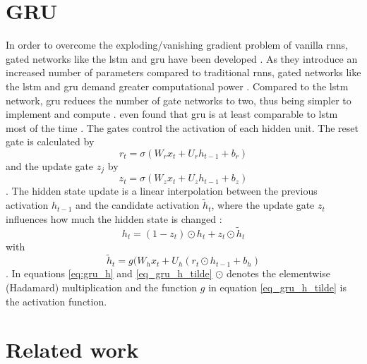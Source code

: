 \documentclass[12pt, a4paper, headinclude, twoside, plainheadsepline, open=right, numbers=noenddot, hidelinks, toc=listof, toc=bibliography]{scrreprt}
\begin{document}
\section{GRU}
\label{sec:gru}
In order to overcome the exploding/vanishing gradient problem of vanilla \acp{rnn}, gated networks like the \ac{lstm} \cite{hochreiterLongShortTermMemory1997} and \ac{gru} \cite{choLearningPhraseRepresentations2014} have been developed \cite{vanhoudtReviewLongShortterm2020}.
As they introduce an increased number of parameters compared to traditional \acp{rnn}, gated networks like the \ac{lstm} and \ac{gru} demand greater computational power \cite{deyGatevariantsGatedRecurrent2017}.
Compared to the \ac{lstm} network, \ac{gru} reduces the number of gate networks to two, thus being simpler to implement and compute \cite{choLearningPhraseRepresentations2014}.
 even found that \ac{gru} is at least comparable to \ac{lstm} most of the time \cite{chungEmpiricalEvaluationGated2014}.
The gates control the activation of each hidden unit.
The reset gate is calculated by
\begin{equation}
\label{eq:gru_reset}
r_t = \sigma (W_r x_t + U_r h_{t-1} + b_r)
\end{equation}
and the update gate $z_j$ by
\begin{equation}
\label{eq:gru_update}
z_t = \sigma (W_z x_t + U_z h_{t-1} + b_z)
\end{equation}
\cite{deyGatevariantsGatedRecurrent2017}.
The hidden state update is a linear interpolation between the previous activation $h_{t-1}$ and the candidate activation $\tilde{h}_t$, where the update gate $z_t$ influences how much the hidden state is changed \cite{chungEmpiricalEvaluationGated2014}:
\begin{equation}
\label{eq:gru_h}
h_t = (1-z_t) \odot h_t + z_t \odot \tilde{h}_t
\end{equation}
with
\begin{equation}
\label{eq_gru_h_tilde}
\tilde{h}_t = g(W_h x_t + U_h (r_t \odot h_{t-1} + b_h)
\end{equation}
.
In equations \ref{eq:gru_h} and \ref{eq_gru_h_tilde} $\odot$ denotes the elementwise (Hadamard) multiplication and the function $g$ in equation \ref{eq_gru_h_tilde} is the activation function.



\section{Related work}
\label{sec:related}
\end{document}

